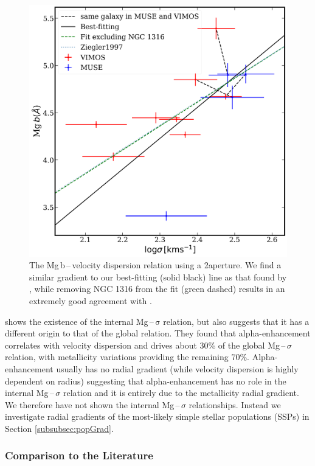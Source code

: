 			\begin{figure}[t]
				\centering
				\includegraphics[width=.8\textwidth]{chapter4/Mg_sigma.png}
				\caption[Global Mg\,b\,--\,$\sigma$]{The Mg\,b\,--\,velocity dispersion relation using a 2\arcsec aperture. We find a similar gradient to our best-fitting (solid black) line as that found by \citet[; blue dotted line]{Ziegler1997}, while removing NGC 1316 from the fit (green dashed) results in an extremely good agreement with \citet{Ziegler1997}.}
				\label{fig:globalMg}
			\end{figure}

			\citet{Mehlert2003} shows the existence of the internal Mg\,--\,$\mathrm{\sigma}$ relation, but also suggests that it has a different origin to that of the global relation. They found that alpha-enhancement correlates with velocity dispersion and drives about 30\% of the global Mg\,--\,$\sigma$ relation, with metallicity variations providing the remaining 70\%. Alpha-enhancement usually has no radial gradient (while velocity dispersion is highly dependent on radius) suggesting that alpha-enhancement has no role in the internal Mg\,--\,$\sigma$ relation and it is entirely due to the metallicity radial gradient. We therefore have not shown the internal Mg\,--\,$\sigma$ relationships. Instead we investigate radial gradients of the most-likely simple stellar populations (SSPs) in Section \ref{subsubsec:popGrad}.


		\subsubsection{Comparison to the Literature}
			\label{subsubsec:Lit}

